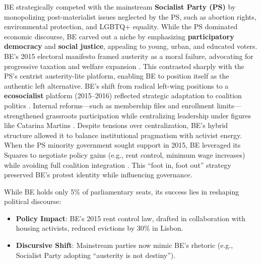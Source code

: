 \begin{greenenv}

	BE strategically competed with the mainstream \textbf{Socialist Party (PS)} by monopolizing post-materialist issues neglected by the PS, such as abortion rights, environmental protection, and LGBTQ+ equality. While the PS dominated economic discourse, BE carved out a niche by emphasizing \textbf{participatory democracy} and \textbf{social justice}, appealing to young, urban, and educated voters. BE’s 2015 electoral manifesto framed austerity as a moral failure, advocating for progressive taxation and welfare expansion \parencite[3]{lisi2016}. This contrasted sharply with the PS’s centrist austerity-lite platform, enabling BE to position itself as the authentic left alternative. BE’s shift from radical left-wing positions to a \textbf{ecosocialist} platform (2015–2016) reflected strategic adaptation to coalition politics \parencite[136]{lisi2009}. Internal reforms—such as membership files and enrollment limits—strengthened grassroots participation while centralizing leadership under figures like Catarina Martins \parencite[142]{lisi2016}. Despite tensions over centralization, BE’s hybrid structure allowed it to balance institutional pragmatism with activist energy. When the PS minority government sought support in 2015, BE leveraged its Squares to negotiate policy gains (e.g., rent control, minimum wage increases) while avoiding full coalition integration \parencite[15]{lisi2016}. This “foot in, foot out” strategy preserved BE’s protest identity while influencing governance.

	While BE holds only 5\% of parliamentary seats, its success lies in reshaping political discourse:
	\begin{itemize}
		\item \textbf{Policy Impact}: BE’s 2015 rent control law, drafted in collaboration with housing activists, reduced evictions by 30\% in Lisbon.
		\item \textbf{Discursive Shift}: Mainstream parties now mimic BE’s rhetoric (e.g., Socialist Party adopting \enquote{austerity is not destiny}).
	\end{itemize}


\end{greenenv}
